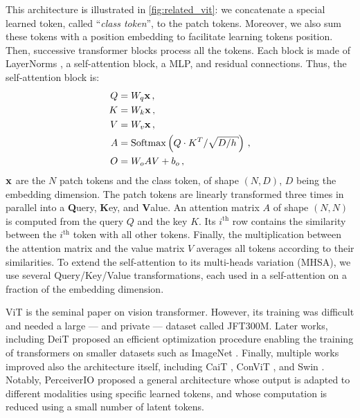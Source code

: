This architecture is illustrated in \autoref{fig:related_vit}: we concatenate a special learned
token, called ``\textit{class token}'', to the patch tokens. Moreover, we also sum these tokens with
a position embedding to facilitate learning tokens position. Then, successive
transformer blocks process all the tokens. Each block is made of LayerNorms \citep{ba2016layernorm},
a self-attention block, a \ac{MLP}, and residual connections. Thus, the self-attention block is:
%
\begin{equation}
      \begin{aligned}
            Q & =W_{q} \vx\,,                                                       \\
            K & =W_{k} \vx\,,                                                       \\
            V & =W_{v} \vx\,,                                                       \\
            A & =\operatorname{Softmax}\left(Q \cdot K^{T} / \sqrt{D / h}\right)\,, \\
            O & = W_{o} A V+b_{o}\,,
      \end{aligned}
      \label{eq:related_sa}
\end{equation}
%
\noindent $\mathbf{x}$ are the $N$ patch tokens and the class token, of shape $(N, D)$, $D$ being the
embedding dimension. The patch tokens are linearly transformed three times in parallel into a
\textbf{Q}uery, \textbf{K}ey, and \textbf{V}alue. An attention matrix $A$ of shape $(N, N)$ is
computed from the query $Q$ and the key $K$. Its $i^{\text{th}}$ row contains the similarity between
the $i^{\text{th}}$ token with all other tokens. Finally, the multiplication between the attention
matrix and the value matrix $V$ averages all tokens according to their similarities. To extend the
self-attention to its multi-heads variation (\ac{MHSA}), we use several Query/Key/Value
transformations, each used in a self-attention on a fraction of the embedding dimension.

ViT \citep{dosovitskiy2020vit} is the seminal paper on vision transformer. However, its training was
difficult and needed a large --- and private --- dataset called JFT300M. Later works, including DeiT
\citep{touvron2021deit} proposed an efficient optimization procedure enabling the training of
transformers on smaller datasets such as ImageNet \citep{russakovsky2015imagenet_ilsvrc}. Finally,
multiple works improved also the architecture itself, including CaiT \citep{touvron2021cait}, ConViT
\citep{dascoli2021convit}, and Swin \citep{liu2021swin}. Notably, PerceiverIO
\citep{jaegle2021perceiverio} proposed a general architecture whose output is adapted to different
modalities using specific learned tokens, and whose computation is reduced using a small number of
latent tokens.

